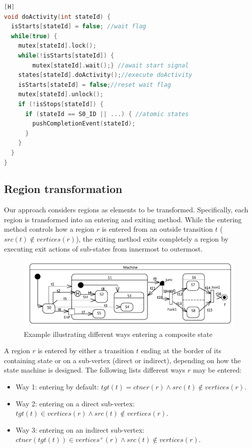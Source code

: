 \begin{lstlisting}[caption=Example code generated for doActivity, label=lst:doActivity, language=C++][H]
void doActivity(int stateId) {
  isStarts[stateId] = false; //wait flag
  while(true) {
    mutex[stateId].lock();
    while(!isStarts[stateId]) {      
	    mutex[stateId].wait();}	//await start signal
    states[stateId].doActivity();//execute doActivity
    isStarts[stateId] = false;//reset wait flag
    mutex[stateId].unlock();
    if (!isStops[stateId]) {
      if (stateId == S0_ID || ...) { //atomic states
        pushCompletionEvent(stateId);
      }
    }
  }
}
\end{lstlisting}


\subsection{Region transformation}
\label{subsubsec:region-trans}
Our approach considers regions as elements to be transformed. Specifically, each region is transformed into an entering and exiting method. 
While the entering method controls how a region $r$ is entered from an outside transition $t$ ($src(t) \notin vertices(r)$), the exiting method exits completely a region by executing exit actions of sub-states from innermost to outermost.

\begin{figure}
	\centering
	\includegraphics[clip, trim=0.2cm 0.2cm 0.2cm 0.2cm, width=1.0\columnwidth]{figures/EnteringStateExample.pdf}
	\caption{Example illustrating different ways entering a composite state} 
	\label{fig:entering}
\end{figure}

A region $r$ is entered by either a transition $t$ ending at the border of its containing state or on a sub-vertex (direct or indirect), depending on how the state machine is designed. 
The following lists different ways $r$ may be entered:
\begin{itemize}
	\item Way 1: entering by default: $tgt(t) = ctner(r) \wedge src(t) \notin vertices(r)$.
	
	\item Way 2: entering on a direct sub-vertex: $tgt(t) \in vertices(r) \wedge src(t) \notin vertices(r)$.
	
	\item Way 3: entering on an indirect sub-vertex: $ctner(tgt(t)) \in vertices^+(r) \wedge src(t) \notin vertices(r)$.
\end{itemize} 

